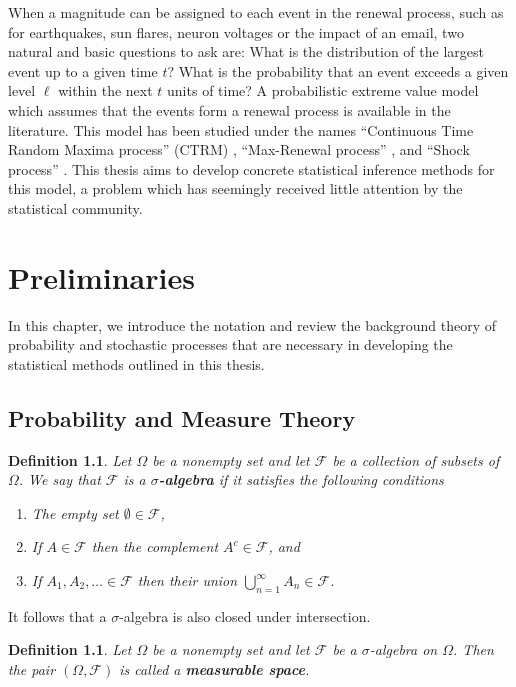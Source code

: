 \documentclass[honours,12pt]{unswthesis}
\newcommand{\1}{\mathbf 1}
\newcommand{\FF}{\mathcal{F}}
\newtheorem{definition}[equation]{Definition}
\numberwithin{equation}{section}
\theoremstyle{definition}
\theoremstyle{remark}
\begin{document}
When a magnitude can be assigned to each event in the renewal process, 
such as for earthquakes, sun flares, neuron voltages or the impact of an email,
two natural and basic questions to ask are: 
What is the distribution of the largest event up to a given time $t$?
What is the probability that an event exceeds a given level $\ell$ within the
next $t$ units of time?
A probabilistic extreme value model which assumes that the events form a 
renewal process is available in the literature. 
This model has been studied under the names
``Continuous Time Random Maxima process'' (CTRM) 
\cite{Benson2007,Meerschaert2009,Hees16,Hees2015}, 
``Max-Renewal process'' \cite{Silvestrov2002a,ST04,Basrak2014}, 
and ``Shock process'' 
\cite{Esary1973,Sumita1983,Sumita1984,Sumita1985,Anderson1987,Gut1999}.
This thesis aims to develop concrete statistical inference methods for this model, 
a problem which has seemingly received little attention by the statistical 
community.

\chapter{Preliminaries}\label{prelim}
In this chapter, we introduce the notation and review the background theory of probability and stochastic processes that are necessary in developing the statistical methods outlined in this thesis.
\section{Probability and Measure Theory}

\begin{definition}
Let $\Omega$ be a nonempty set and let $\FF$ be a collection of subsets of $\Omega$. We say that $\FF$ is a \textbf{$\sigma$-algebra} if it satisfies the following conditions
\begin{enumerate}
\item The empty set $\emptyset \in \FF$,
\item If $A\in \FF$ then the complement $A^c\in \FF$, and
\item If $A_1,A_2,\ldots \in \FF$ then their union $\bigcup_{n=1}^\infty A_n \in \FF$.
\end{enumerate}
\end{definition}
\noindent It follows that a $\sigma$-algebra is also closed under intersection.\\
\begin{definition}
Let $\Omega$ be a nonempty set and let $\FF$ be a $\sigma$-algebra on $\Omega$. Then the pair $(\Omega,\FF)$ is called a \textbf{measurable space}.\\
\end{definition}
\end{document}
